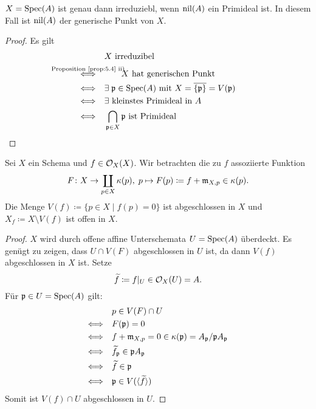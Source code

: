 \begin{lem}
\label{lem:6.3}
	$X=\operatorname{Spec}(A)$ ist genau dann irreduziebl, wenn $\operatorname{nil}(A)$ ein Primideal ist. In diesem Fall ist $\operatorname{nil}(A)$ der generische Punkt von $X$.
	\begin{proof}
		Es gilt
		\begin{align*}
			&X \text{ irreduzibel}\\
			\overset{\mathclap{\text{Proposition~\ref{prop:5.4} ii)}}}{\Longleftrightarrow} \quad & \qquad X \text{ hat generischen Punkt}\\
			 \Longleftrightarrow \quad & \exists\; \mfp \in \Spec(A) \text{ mit } X = \overline{\{\mfp\}} = V(\mfp)\\
			 \Longleftrightarrow \quad & \exists \text{ kleinstes Primideal in } A\\
			 \Longleftrightarrow \quad &  \bigcap_{\mfp \in X} \mfp \text{ ist Primideal}
		\end{align*}
	\end{proof}
\end{lem}

\begin{lem}
\label{lem:6.4}
	Sei $X$ ein Schema und $f \in \mathcal{O}_X(X)$. Wir betrachten die zu $f$ assoziierte Funktion
	\[
		F\colon X \to \coprod_{p \in X}\kappa(p),\; p \mapsto F(p)\coloneqq f+\mathfrak{m}_{X,p}\in \kappa(p).
	\]
	Die Menge $V(f) \coloneqq \{p\in X\mid f(p) = 0\}$ ist abgeschlossen in $X$ und $X_f\coloneqq X \setminus V(f)$ ist offen in $X$.
	\begin{proof}
		$X$ wird durch offene affine Unterschemata $U=\operatorname{Spec}(A)$ überdeckt. Es genügt zu zeigen, dass $U\cap V(F)$ abgeschlossen in $U$ ist, da dann $V(f)$ abgeschlossen in $X$ ist. Setze
		\[
			\widetilde{f}\coloneqq f\vert_U\in \mathcal{O}_X(U) = A.
		\]
		Für $\mathfrak{p}\in U = \operatorname{Spec}(A)$ gilt:
		\begin{align*}
			&p \in V(F) \cap U\\
			\Longleftrightarrow \quad & F(\mathfrak{p})=0\\
			\Longleftrightarrow \quad & f+\mathfrak{m}_{X,p} = 0 \in \kappa(\mathfrak{p}) = A_{\mathfrak{p}}/\mathfrak{p} A_{\mathfrak{p}}\\
			\Longleftrightarrow \quad & \widetilde{f}_{\mathfrak{p}} \in \mathfrak{p} A_{\mathfrak{p}}\\
			\Longleftrightarrow \quad & \widetilde{f} \in \mathfrak{p}\\
			\Longleftrightarrow \quad & \mathfrak{p} \in V(\langle \widetilde{f} \rangle)
		\end{align*}
		Somit ist $V(f)\cap U$ abgeschlossen in $U$.
	\end{proof}
\end{lem}

